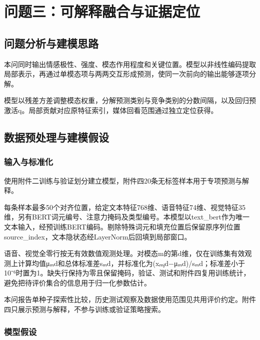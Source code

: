 \section{问题三：可解释融合与证据定位}
\hypertarget{q3-ux95eeux9898ux5206ux6790ux4e0eux5efaux6a21ux601dux8def}{%
\subsection{问题分析与建模思路}\label{q3-ux95eeux9898ux5206ux6790ux4e0eux5efaux6a21ux601dux8def}}

本问同时输出情感极性、强度、模态作用程度和关键位置。模型以非线性编码提取局部表示，再通过单模态项与两两交互形成预测，使同一次前向的输出能够逐项分解。

模型以残差方差调整模态权重，分解预测类别与竞争类别的分数间隔，以及回归预激活q。局部贡献对应原特征索引，媒体回看范围通过独立定位获得。

\hypertarget{q3-ux6570ux636eux9884ux5904ux7406ux4e0eux5efaux6a21ux5047ux8bbe}{%
\subsection{数据预处理与建模假设}\label{q3-ux6570ux636eux9884ux5904ux7406ux4e0eux5efaux6a21ux5047ux8bbe}}

\hypertarget{q3-ux8f93ux5165ux4e0eux6807ux51c6ux5316}{%
\subsubsection{输入与标准化}\label{q3-ux8f93ux5165ux4e0eux6807ux51c6ux5316}}

使用附件二训练与验证划分建立模型，附件四20条无标签样本用于专项预测与解释。

每条样本最多50个对齐位置，给定文本特征768维、语音特征74维、视觉特征35维，另有BERT词元编号、注意力掩码及类型编号。本模型以text\_bert作为唯一文本输入，经预训练BERT\cite{q2-ref1}编码。剔除特殊词元和填充位置后保留原序列位置source\_index，文本隐状态经LayerNorm后回填到局部窗口。

语音、视觉全零行按无有效数值观测处理。对模态m的第d维，仅在训练集有效观测上计算均值μₘd和总体标准差sₘd，并标准化为(xₘⱼd−μₘd)/sₘd；标准差小于10⁻⁶时置为1。缺失行保持为零且保留掩码，验证、测试和附件四复用训练统计，避免把待评价集合的信息用于归一化参数估计。

本问报告单种子探索性比较，历史测试观察及数据使用范围见共用评价约定。附件四只展示预测与解释，不参与训练或验证策略搜索。

\hypertarget{q3-ux6a21ux578bux5047ux8bbe}{%
\subsubsection{模型假设}\label{q3-ux6a21ux578bux5047ux8bbe}}

